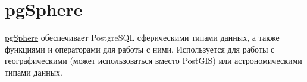 \section{pgSphere}

\href{http://pgsphere.projects.pgfoundry.org/}{pgSphere} обеспечивает PostgreSQL сферическими типами данных, а также функциями и операторами для работы с ними. Используется для работы с географическими (может использоваться вместо PostGIS) или астрономическими типами данных.